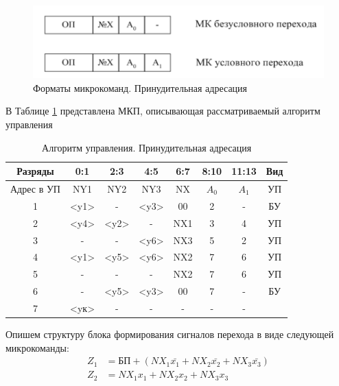 \documentclass[a4paper,14pt]{extarticle}
\begin{document}
\begin{figure}[h!]
	\centering
	\includegraphics[width=0.5\linewidth]{images/mk-mix}
	\caption{Форматы микрокоманд. Принудительная адресация}
	\label{fig:mk-mix}
\end{figure}

В Таблице \ref{tab:manage-algorithm} представлена МКП, описывающая рассматриваемый алгоритм управления


\begin{table}[htbp]
	\centering

	\begin{tabular}{|c|c|c|c|c|c|c|c|}
		\hline
		Разряды & 0:1 & 2:3 & 4:5 & 6:7 & 8:10 & 11:13 & Вид \\ \hline
		Адрес в УП & NY1 & NY2 & NY3 & NX & $A_0$ & $A_1$ & УП \\ \hline \hline
		1 & <y1> & - & <y3> & 00 & 2 & - & БУ \\ \hline
		2 & <y4> & <y2> & - & NX1 & 3 & 4 & УП \\ \hline
		3 & - & - & <y6> & NX3 & 5 & 2 & УП \\ \hline
		4 & <y1> & <y5> & <y6> & NX2 & 7 & 6 & УП \\ \hline
		5 & - & - & - & NX2 & 7 & 6 & УП \\ \hline
		6 & - & <y5> & <y3> & 00 & 7 & - & БУ \\ \hline
		7 & <yк> & - & - & - & - & - &  \\ \hline
	\end{tabular}
	\caption{Алгоритм управления. Принудительная адресация }
	\label{tab:manage-algorithm}
\end{table}

Опишем структуру блока формирования сигналов перехода в виде следующей
микрокоманды:
\begin{align*}
	Z_1 & = БП + \left(NX_1\bar{x_1}+NX_2\bar{x_2}+NX_3\bar{x_3}\right) \\
	Z_2 & = NX_1x_1+NX_2x_2+NX_3x_3
\end{align*}
\end{document}
